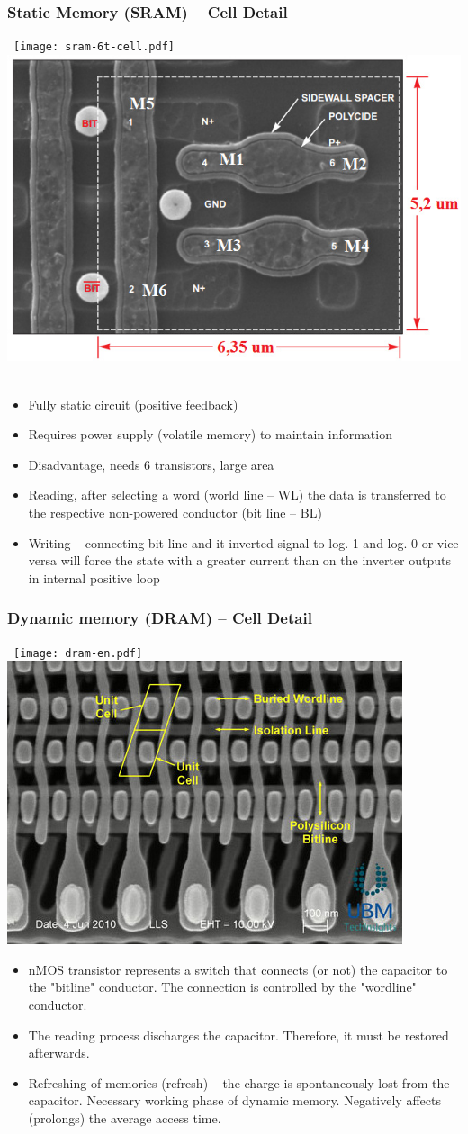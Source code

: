 \documentclass{beamer}
\begin{document}
\begin{frame}
\frametitle{Static Memory (SRAM) -- Cell Detail}

\hbox{
\texttt{[image: sram-6t-cell.pdf]}\hspace{0.1\linewidth}\includegraphics[width=0.4\linewidth]{fig/sram-cell.jpg}
}

\begin{itemize}
\item Fully static circuit (positive feedback)
\item Requires power supply (volatile memory) to maintain information
\item Disadvantage, needs 6 transistors, large area
\item Reading, after selecting a word (world line -- WL) the data is transferred to the respective non-powered conductor (bit line -- BL)
\item Writing -- connecting bit line and it inverted signal to log. 1 and log. 0 or vice versa will force the state with a greater current than on the inverter outputs in internal positive loop
\end{itemize}

\end{frame}

\begin{frame}
\frametitle{Dynamic memory (DRAM) -- Cell Detail}

\hbox{
\texttt{[image: dram-en.pdf]}\hspace{0.1\linewidth}\includegraphics[width=0.4\linewidth]{fig/dram-cell.jpg}
}

\begin{itemize}
\item nMOS transistor represents a switch that connects (or not) the capacitor to the "bitline" conductor. The connection is controlled by the "wordline" conductor.
\item The reading process discharges the capacitor. Therefore, it must be restored afterwards.
\item Refreshing of memories (refresh) – the charge is spontaneously lost from the capacitor. Necessary working phase of dynamic memory. Negatively affects (prolongs) the average access time.
\end{itemize}

\end{frame}
\end{document}
